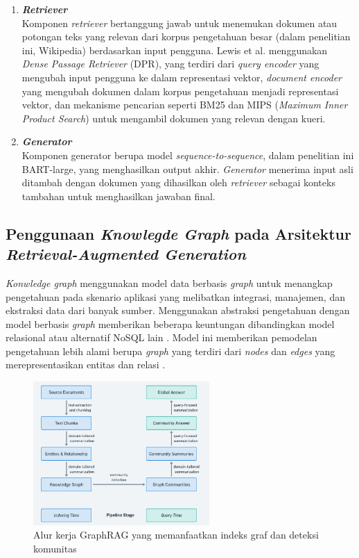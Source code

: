 \begin{enumerate}
	\item \textbf{\textit{Retriever}} \\
	      Komponen \textit{retriever} bertanggung jawab untuk menemukan dokumen atau potongan teks yang relevan dari korpus pengetahuan besar (dalam penelitian ini, Wikipedia) berdasarkan input pengguna.
	      Lewis et al. menggunakan \textit{Dense Passage Retriever} (DPR), yang terdiri dari
	      \textit{query encoder} yang mengubah input pengguna ke dalam representasi vektor,
	      \textit{document encoder} yang mengubah dokumen dalam korpus pengetahuan menjadi representasi vektor, dan
	      mekanisme pencarian seperti BM25 dan MIPS (\textit{Maximum Inner Product Search}) untuk mengambil dokumen yang relevan dengan kueri.
	\item \textbf{\textit{Generator}} \\
	      Komponen generator berupa model \textit{sequence-to-sequence}, dalam penelitian ini BART-large, yang menghasilkan output akhir.
	      \textit{Generator} menerima input asli ditambah dengan dokumen yang dihasilkan oleh \textit{retriever} sebagai konteks tambahan untuk menghasilkan jawaban final.
\end{enumerate}


\subsection{Penggunaan \textit{Knowlegde Graph} pada Arsitektur \textit{Retrieval-Augmented Generation}}
\textit{Konwledge graph} menggunakan model data berbasis \textit{graph} untuk menangkap pengetahuan pada skenario aplikasi yang melibatkan integrasi, manajemen, dan ekstraksi data dari banyak sumber.
Menggunakan abstraksi pengetahuan dengan model berbasis \textit{graph} memberikan beberapa keuntungan dibandingkan model relasional atau alternatif NoSQL lain \cite{IndustryScaleKnowledgeGraph}.
Model ini memberikan pemodelan pengetahuan lebih alami berupa \textit{graph} yang terdiri dari \textit{nodes} dan \textit{edges} yang merepresentasikan entitas dan relasi \cite{ComparisonofCurrentGraphDatabaseModels}. \\

\begin{figure}[h]
	\centering
	\includegraphics[width=0.6\textwidth]{images/graph-rag-pipeline.png}
	\caption{
		Alur kerja GraphRAG yang memanfaatkan indeks graf dan deteksi komunitas
	}
	\label{fig:graphragpipeline}
\end{figure}

